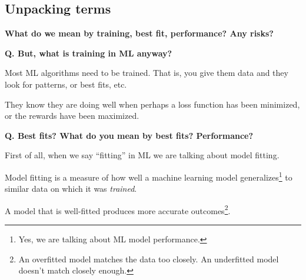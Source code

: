 \subsection{Unpacking terms}
\begin{transitionsubframe}
  \begin{center}
    \Huge \textbf{What do we mean by training, best fit, performance? Any risks?}
  \end{center}
\end{transitionsubframe}

\begin{frame}[fragile]{\textbf{Q. But, what is training in ML anyway?}}
  \begin{wideitemize}
    \item Most ML algorithms need to be trained. That is, you give
    them data and they look for patterns, or best fits, etc.
    \item They know they are doing well when perhaps a loss function
    has been minimized, or the rewards have been maximized.
  \end{wideitemize}
\end{frame}

\begin{frame}[fragile]{\textbf{Q. Best fits? What do you mean by best fits? Performance?}}
  \begin{wideitemize}
    \item First of all, when we say ``fitting'' in ML we are talking about model fitting.
    \item Model fitting is a measure of how well a machine learning model
    generalizes\footnote{Yes, we are talking about ML model performance.} to similar data
    on which it was \textit{trained}.
    \item A model that is well-fitted produces more accurate outcomes\footnote{An overfitted model
    matches the data too closely. An underfitted model doesn't match closely enough.}.
  \end{wideitemize}
\end{frame}

